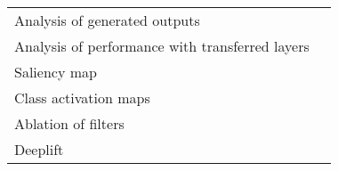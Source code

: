 \begin{tabular}{ll}
Analysis of generated outputs                          &                                                                                                                                                                               \cite{Hartmann2018} \\
Analysis of performance with transferred layers        &                                                                                                                                                                            \cite{Hajinoroozi2017} \\
Saliency map                                           &                                                                                                                                                                               \cite{Vilamala2017} \\
Class activation maps                                  &                                                                                                                                                                                  \cite{Ghosh2018} \\
Ablation of filters                                    &                                                                                                                                                                                \cite{Lawhern2018} \\
Deeplift                                               &                                                                                                                                                                                \cite{Lawhern2018} \\
\bottomrule
\end{tabular}
